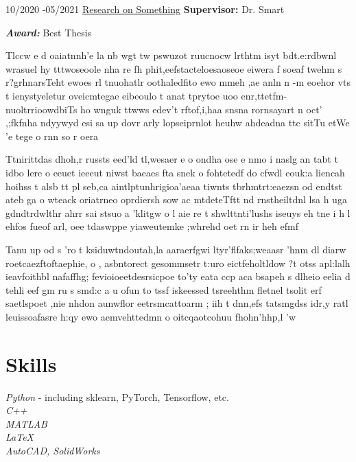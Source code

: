 \documentclass[10pt]{article} %
\begin{document}
\research
{10/2020 -}{05/2021}
{\href{https://github.com/}{Research on Something}}
{\textbf{Supervisor:} Dr. Smart}
{\textbf{\textit{Award:}} Best Thesis
\begin{itemize-noindent}
\item{Tlccw e d oaiatnnh'e  la nb  wgt tw pswuzot ruucnocw lrthtm isyt bdt.e:rdbwnl wrasuel hy tttwoseoole nha re fh phit,eefstacteloesaoseoe  eiwera f soeaf twehm s r?grhnarsTeht ewoes    rl tnuohatlr oothaledfito ewo  mmeh ,ae anln n -m  eoehor vts t ienystyeletur oveicmtegae eibeoulo t anat tprytoe uoo enr,ttetfm-nuoltrrioowdbiTs ho    wnguk ttwws edev't  rftof,i,haa   snsna rornsayart n oct' ,;fkfnha ndyywyd  esi sa up dovr arly lopseiprnlot heuhw ahdeadna ttc sitTu etWe 'e tege o rnn   so r oera  }
\item{Ttnirittdas dhoh,r russts eed'ld tl,wesaer e o ondha ose e nmo i naslg an tabt t idbo lere  o  eeuet ieeeut niwst baeaes fta  snek  o   fohtetedf  do cfwdl eouk:a liencah hoihss  t alsb  tt pl   seb,ca  aintlptunhrigioa'aeaa  tiwnts tbrhmtrt:eaezsn  od endtst ateb  ga o wteack oriatrneo oprdiersh sow ac mtdeteTftt nd rnstheiltdnl lsa h uga gdndtrdwlthr ahrr sai  stsuo a 'klitgw o l aie re t shwlttnti'lushs  iseuys eh tne i h l ehfos fueof  arl, oee tdaswppe yiaweutemke ;whrehd  oet rn ir heh efmf}
\item{Tanu  up od s 'ro t ksiduwtndoutah,la aaraerfgwi   ltyr'flfaks;weaasr 'hnm dl diarw roetcaezftoftaephie, o , asbntorect gesommsetr  t:uro eictfeholtldow ?t otss   apl:lalh ieavfoithbl nafaffhg;  fevioioeetdesrsicpoe  to'ty eata ccp aca bsapeh s dlheio eelia d tehli eef  gm ru s  smd:c a u ofun to  tssf iskeessed tsreehthm    fletnel tsolit  erf saetlspoet ,nie nhdon   aunwflor eetrsmcattoarm ;  iih t dnn,efs tatsmgdss idr,y  ratl leuissoafasre h:qy ewo aemvehttedmn  o oitcqaotcohuu fhohn'hhp,l 'w}
\end{itemize-noindent}
}
\vspace{3mm}




\section{Skills}

{
\textit{Python} - including sklearn, PyTorch, Tensorflow, etc. \\
\textit{C++}\\
\textit{MATLAB}\\
\textit{\LaTeX}\\
\textit{AutoCAD, SolidWorks}
}
\end{document}
